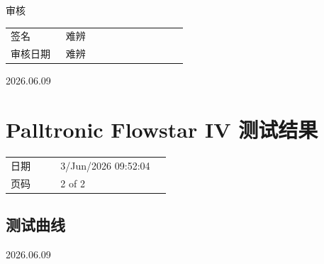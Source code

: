 \documentclass[UTF8,10pt,a4paper,fontset=fandol]{ctexart}
\newcommand{\fieldvalue}[1]{#1}
\newcommand{\handwritten}[1]{#1}
\begin{document}
\vspace{1em}

审核

\begin{tabular}{@{}p{0.28\linewidth}p{0.62\linewidth}@{}}
签名 &
\fieldvalue{\handwritten{难辨}}
\\
审核日期 &
\fieldvalue{\handwritten{难辨}}
\end{tabular}

\vspace{1em}

\handwritten{2026.06.09}

\section{Palltronic Flowstar IV 测试结果}

\begin{tabular}{@{}p{0.28\linewidth}p{0.62\linewidth}@{}}
日期 &
\fieldvalue{3/Jun/2026 09:52:04}
\\
页码 &
\fieldvalue{2 of 2}
\end{tabular}

\subsection{测试曲线}

\begin{center}
\end{center}

\handwritten{2026.06.09}
\end{document}
